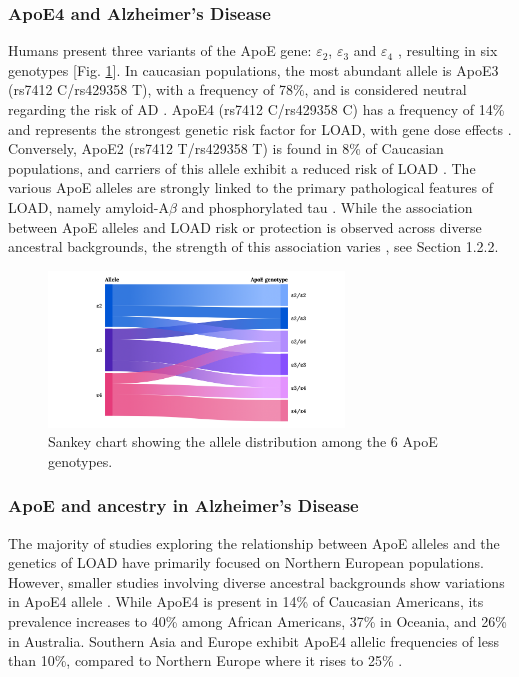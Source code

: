 \documentclass{amsart}
\begin{document}
\subsubsection{ApoE4 and Alzheimer's Disease}
Humans present three variants of the ApoE gene: $\varepsilon_2$, $\varepsilon_3$ and $\varepsilon_4$ \cite{Husain2021APOETherapeutics, Yang2023ApolipoproteinDisease}, resulting in six genotypes [Fig. \ref{fig1}]. In caucasian populations, the most abundant allele is ApoE3 (rs7412 C/rs429358 T), with a frequency of 78\%, and is considered neutral regarding the risk of AD \cite{Liu2013ApolipoproteinTherapy}. ApoE4 (rs7412 C/rs429358 C) has a frequency of 14\% and represents the strongest genetic risk factor for LOAD, with gene dose effects \cite{Strittmatter1993ApolipoproteinDisease}. Conversely, ApoE2 (rs7412 T/rs429358 T) is found in 8\% of Caucasian populations, and carriers of this allele exhibit a reduced risk of LOAD \cite{Liu2013ApolipoproteinTherapy}. The various ApoE alleles are strongly linked to the primary pathological features of LOAD, namely amyloid-A$\beta$ and phosphorylated tau \cite{Deming2017Genome-wideModifiers}. While the association between ApoE alleles and LOAD risk or protection is observed across diverse ancestral backgrounds, the strength of this association varies \cite{Belloy2019AForward, Farrer1997EffectsMeta-analysis}, see Section 1.2.2.

\begin{figure}[H]
  \includegraphics[width=0.7\textwidth]{figures/ApoE@2x.png}
    \caption{Sankey chart showing the allele distribution among the 6 ApoE genotypes.}
  \label{fig1}
\end{figure}

\subsubsection{ApoE and ancestry in Alzheimer's Disease}
The majority of studies exploring the relationship between ApoE alleles and the genetics of LOAD have primarily focused on Northern European populations\cite{Yang2023ApolipoproteinDisease}. However, smaller studies involving diverse ancestral backgrounds show variations in ApoE4 allele \cite{Yang2023ApolipoproteinDisease}. While ApoE4 is present in 14\% of Caucasian Americans, its prevalence increases to 40\% among African Americans, 37\% in Oceania, and 26\% in Australia. Southern Asia and Europe exhibit ApoE4 allelic frequencies of less than 10\%, compared to Northern Europe where it rises to 25\% \cite{Belloy2019AForward, Egert2012ApoEFactors, Eisenberg2010WorldwideHistory, Logue2011AAmericans}.
\end{document}
